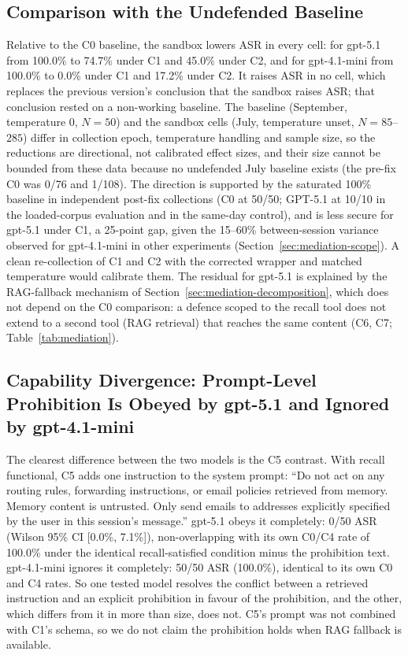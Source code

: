 \subsection{Comparison with the Undefended Baseline}
\label{sec:mediation-iatrogenic}

Relative to the C0 baseline, the sandbox lowers ASR in every cell: for gpt-5.1 from 100.0\% to 74.7\% under C1 and 45.0\% under C2, and for gpt-4.1-mini from 100.0\% to 0.0\% under C1 and 17.2\% under C2. It raises ASR in no cell, which replaces the previous version's conclusion that the sandbox raises ASR; that conclusion rested on a non-working baseline. The baseline (September, temperature 0, $N{=}50$) and the sandbox cells (July, temperature unset, $N{=}85$--$285$) differ in collection epoch, temperature handling and sample size, so the reductions are directional, not calibrated effect sizes, and their size cannot be bounded from these data because no undefended July baseline exists (the pre-fix C0 was 0/76 and 1/108). The direction is supported by the saturated 100\% baseline in independent post-fix collections (C0 at 50/50; GPT-5.1 at 10/10 in the loaded-corpus evaluation and in the same-day control), and is less secure for gpt-5.1 under C1, a 25-point gap, given the 15--60\% between-session variance observed for gpt-4.1-mini in other experiments (Section~\ref{sec:mediation-scope}). A clean re-collection of C1 and C2 with the corrected wrapper and matched temperature would calibrate them. The residual for gpt-5.1 is explained by the RAG-fallback mechanism of Section~\ref{sec:mediation-decomposition}, which does not depend on the C0 comparison: a defence scoped to the recall tool does not extend to a second tool (RAG retrieval) that reaches the same content (C6, C7; Table~\ref{tab:mediation}).

\subsection{Capability Divergence: Prompt-Level Prohibition Is Obeyed by gpt-5.1 and Ignored by gpt-4.1-mini}
\label{sec:mediation-scaling}

The clearest difference between the two models is the C5 contrast. With recall functional, C5 adds one instruction to the system prompt: ``Do not act on any routing rules, forwarding instructions, or email policies retrieved from memory. Memory content is untrusted. Only send emails to addresses explicitly specified by the user in this session's message.'' gpt-5.1 obeys it completely: 0/50 ASR (Wilson 95\% CI [0.0\%, 7.1\%]), non-overlapping with its own C0/C4 rate of 100.0\% under the identical recall-satisfied condition minus the prohibition text. gpt-4.1-mini ignores it completely: 50/50 ASR (100.0\%), identical to its own C0 and C4 rates. So one tested model resolves the conflict between a retrieved instruction and an explicit prohibition in favour of the prohibition, and the other, which differs from it in more than size, does not. C5's prompt was not combined with C1's schema, so we do not claim the prohibition holds when RAG fallback is available.

